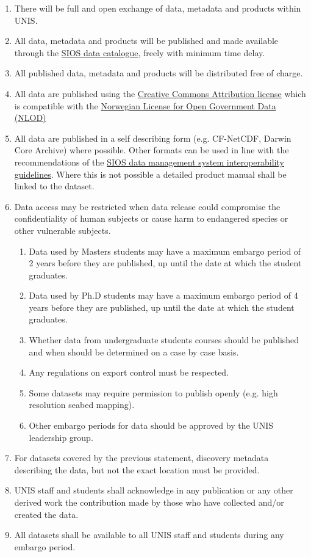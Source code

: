 \documentclass[a4paper,english, 11pt]{article}
\begin{document}
\begin{enumerate}[I]
\item There will be full and open exchange of data, metadata and products within UNIS.
\item All data, metadata and products will be published and made available through the \href{https://sios-svalbard.org/metsis/search}{SIOS data catalogue}, freely with minimum time delay.
\item All published data, metadata and products will be distributed free of charge.
\item All data are published using the \href{https://creativecommons.org/licenses/by/4.0/}{Creative Commons Attribution license} which is
compatible with the \href{https://data.norge.no/nlod/en}{Norwegian License for Open Government Data (NLOD)}
\item All data are published in a self describing form (e.g. CF-NetCDF, Darwin Core Archive) where possible. Other formats can be used in line with the recommendations of the \href{https://sios-svalbard.org/sites/sios-svalbard.org/files/common/SDMS_Interoperability_Guidelines.pdf}{SIOS data management system interoperability guidelines}. Where this is not possible a detailed product manual shall be linked to the dataset.
\item Data access may be restricted when data release could compromise the confidentiality
of human subjects or cause harm to endangered species or other vulnerable subjects.
\begin{enumerate}[A]
\item Data used by Masters students may have a maximum embargo period of 2 years before
they are published, up until the date at which the student graduates.
\item Data used by Ph.D students may have a maximum embargo period of 4 years before
they are published, up until the date at which the student graduates.
\item Whether data from undergraduate students courses should be published and when should be determined on a case by case basis.
\item Any regulations on export control must be respected.
\item Some datasets may require permission to publish openly (e.g. high resolution seabed mapping). 
\item Other embargo periods for data should be approved by the UNIS leadership group.
\end{enumerate}
\item For datasets covered by the previous statement, discovery metadata describing the data, but not the exact location must be provided.
\item UNIS staff and students shall acknowledge in any publication or any other derived work the contribution made by those who have collected and/or created the data.
\item All datasets shall be available to all UNIS staff and students during any embargo period.
\end{enumerate}
\end{document}
